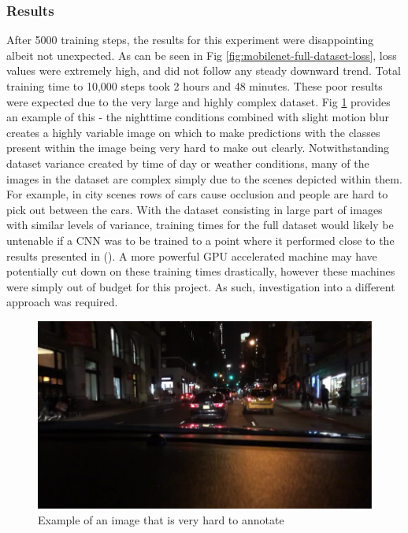 \documentclass[12pt]{report}
\begin{document}
\subsubsection{Results}
\begin{flushleft}
After 5000 training steps, the results for this experiment were disappointing albeit not unexpected. As can be seen in Fig \ref{fig:mobilenet-full-dataset-loss}, loss values were extremely high, and did not follow any steady downward trend. Total training time to 10,000 steps took 2 hours and 48 minutes. These poor results were expected due to the very large and highly complex dataset. Fig \ref{fig:noisy} provides an example of this - the nighttime conditions combined with slight motion blur creates a highly variable image on which to make predictions with the classes present within the image being very hard to make out clearly. Notwithstanding dataset variance created by time of day or weather conditions, many of the images in the dataset are complex simply due to the scenes depicted within them. For example, in city scenes rows of cars cause occlusion and people are hard to pick out between the cars. With the dataset consisting in large part of images with similar levels of variance, training times for the full dataset would likely be untenable if a CNN was to be trained to a point where it performed close to the results presented in (\cite{yu2018bdd100k}). A more powerful GPU accelerated machine may have potentially cut down on these training times drastically, however these machines were simply out of budget for this project. As such, investigation into a different approach was required.
\end{flushleft}

\vspace{0.5cm}
\begin{figure}[ht!]
	\centering
	\includegraphics[width=12cm]{noisy}
	\caption{Example of an image that is very hard to annotate}
	\label{fig:noisy}
\end{figure}
\end{document}
